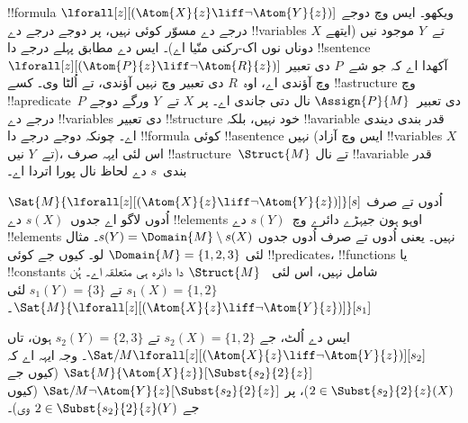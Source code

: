 \documentclass[../../../include/open-logic-section]{subfiles}
\begin{document}
\begin{ex}
  !!{formula} $\lforall[z][(\Atom{X}{z} \liff \lnot
    \Atom{Y}{z})]$ ویکھو۔ ایس وچ دوجے درجے دے
  مسوّر کوئی نہیں، پر دوجے درجے دے !!{variable}s
  $X$ تے~$Y$ موجود نیں (ایتھے دوناں نوں
  اک-رکنی منّیا اے)۔ ایس دے مطابق پہلے درجے
  دا !!{sentence}
  $\lforall[z][(\Atom{P}{z} \liff \lnot \Atom{R}{z})]$
  آکھدا اے کہ جو شے~$P$ دی تعبیر وچ آؤندی اے،
  اوہ~$R$ دی تعبیر وچ نہیں آؤندی، تے اُلٹا وی۔
  کسے !!a{structure} وچ !!a{predicate}~$P$
  دی تعبیر~$\Assign{P}{M}$ نال دتی جاندی اے۔
  پر $X$ تے~$Y$ ورگے دوجے درجے دے !!{variable}s
  دی تعبیر !!{structure} خود نہیں، بلکہ
  !!a{variable} قدر بندی دیندی اے۔ چونکہ دوجے
  درجے دا !!{formula} کوئی !!a{sentence} نہیں
  (ایس وچ آزاد !!{variable}s $X$ تے~$Y$ نیں)،
  اس لئی ایہہ صرف !!a{structure}~$\Struct{M}$
  تے نال !!a{variable} قدر بندی~$s$ دے لحاظ نال
  پورا اتردا اے۔

  $\Sat{M}{\lforall[z][(\Atom{X}{z} \liff \lnot \Atom{Y}{z})]}[s]$
  اُدوں تے صرف اُدوں لاگو اے جدوں~$s(X)$ دے !!{element}s اوہو ہون
  جیہڑے دائرے وچ~$s(Y)$ دے !!{element}s نہیں۔
  یعنی اُدوں تے صرف اُدوں جدوں
  $s(Y) = \Domain{M} \setminus s(X)$۔
  مثال لئی $\Domain{M} = \{1, 2, 3\}$ لو۔
  کیوں جے کوئی !!{predicate}s، !!{function}s
  یا !!{constant}s شامل نہیں، اس لئی
  ~$\Struct{M}$ دا دائرہ ہی متعلقہ اے۔
  ہُن $s_1(X) = \{1, 2\}$ تے $s_1(Y) = \{3\}$
  لئی $\Sat{M}{\lforall[z][(\Atom{X}{z}
      \liff \lnot \Atom{Y}{z})]}[s_1]$۔

  ایس دے اُلٹ، جے $s_2(X) = \{1, 2\}$ تے
  $s_2(Y) = \{2, 3\}$ ہون، تاں
  $\Sat/{M}{\lforall[z][(\Atom{X}{z} \liff \lnot
      \Atom{Y}{z})]}[s_2]$۔ وجہ ایہہ اے کہ
  $\Sat{M}{\Atom{X}{z}}[\Subst{s_2}{2}{z}]$
  (کیوں جے $2 \in \Subst{s_2}{2}{z}(X)$)، پر
  $\Sat/{M}{\lnot \Atom{Y}{z}}[\Subst{s_2}{2}{z}]$
  (کیوں جے $2 \in
  \Subst{s_2}{2}{z}(Y)$ وی)۔
\end{ex}
\end{document}
